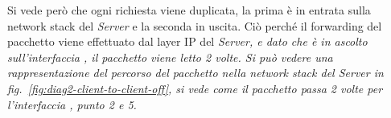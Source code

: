 Si vede però che ogni richiesta viene duplicata, la prima è in entrata sulla network stack del \textit{Server} e la seconda in uscita. Ciò perché il forwarding del pacchetto viene effettuato dal layer IP del \it{Server}, e dato che  è in ascolto sull'interfaccia , il pacchetto viene letto 2 volte. Si può vedere una rappresentazione del percorso del pacchetto nella network stack del \it{Server} in fig.~\ref{fig:diag2-client-to-client-off}, si vede come il pacchetto passa 2 volte per l'interfaccia , punto 2 e 5. 


